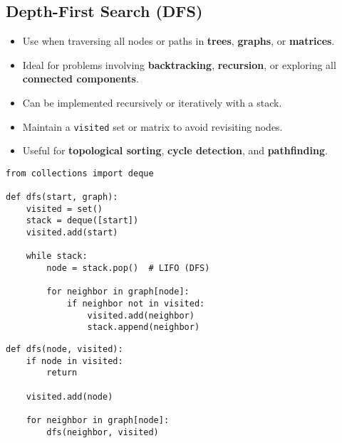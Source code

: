 \subsection{Depth-First Search (DFS)}

\begin{summary}
    \begin{itemize}
        \item Use when traversing all nodes or paths in \textbf{trees}, \textbf{graphs}, or \textbf{matrices}.
        \item Ideal for problems involving \textbf{backtracking}, \textbf{recursion}, or exploring all \textbf{connected components}.
        \item Can be implemented recursively or iteratively with a stack.
        \item Maintain a \texttt{visited} set or matrix to avoid revisiting nodes.
        \item Useful for \textbf{topological sorting}, \textbf{cycle detection}, and \textbf{pathfinding}.
    \end{itemize}
\end{summary}

\begin{algo}
\begin{lstlisting}
from collections import deque

def dfs(start, graph):
    visited = set()
    stack = deque([start])
    visited.add(start)

    while stack:
        node = stack.pop()  # LIFO (DFS)

        for neighbor in graph[node]:
            if neighbor not in visited:
                visited.add(neighbor)
                stack.append(neighbor) 
\end{lstlisting}
    \end{algo}

\begin{algo}
\begin{lstlisting}
def dfs(node, visited):
    if node in visited:
        return

    visited.add(node)

    for neighbor in graph[node]:
        dfs(neighbor, visited)
\end{lstlisting}
\end{algo}

\newpage

